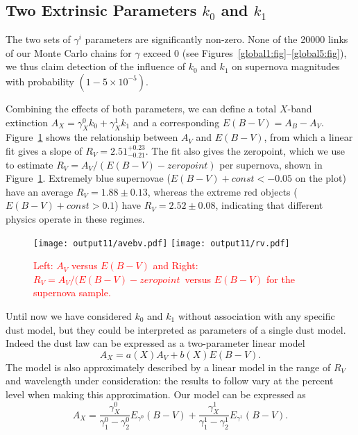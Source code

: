 \documentclass{aastex61}   	%
\begin{document}
\subsection{Two Extrinsic Parameters $k_0$ and $k_1$}
\color{red}
The two sets of  $\gamma^i$ parameters  are significantly non-zero. 
\color{black}
None of the 20000 links of 
our Monte Carlo chains for $\gamma$ exceed 0 (see Figures~\ref{global1:fig}--\ref{global5:fig}), we thus claim detection of the
influence of $k_0$ and $k_1$  on supernova magnitudes
with probability $(1-5\times 10^{-5})$.

\color{red}
Combining the effects of both parameters, we can define a total $X$-band extinction $A_X=\gamma^0_X k_0 + \gamma^1_X k_1$
and a corresponding $E(B-V) = A_B-A_V$.  Figure~\ref{avebv:fig} shows the relationship between $A_V$ and $E(B-V)$, from
which a linear fit gives a slope of $R_V=2.51^{+0.23}_{-0.21}$.  The fit also gives the zeropoint, which we use to 
estimate $R_V=A_V/(E(B-V)-zeropoint)$ per supernova, shown in Figure~\ref{avebv:fig}.
Extremely blue supernovae ($E(B-V) + const <-0.05$ on the plot) have an average $R_V=1.88 \pm   0.13$,
whereas the extreme red objects ($E(B-V) + const >0.1$) have $R_V=  2.52 \pm   0.08$, indicating that different physics
operate in these regimes.

\begin{figure}[htbp] %
   \centering
   \texttt{[image: output11/avebv.pdf]}
   \texttt{[image: output11/rv.pdf]}
   \caption{\textcolor{red}{Left: $A_V$ versus $E(B-V)$ and Right: $R_V=A_V/(E(B-V)-zeropoint$\
   versus $E(B-V)$ for the supernova sample.}
   \label{avebv:fig}}
\end{figure}

Until now we have considered $k_0$ and $k_1$ without association with any specific dust model, but they could be interpreted as
parameters of a single  dust model.  Indeed the \citet{1989ApJ...345..245C} dust law can be expressed as a two-parameter linear model
\begin{equation}
A_X = a(X)  A_V + b(X) E(B-V).
\end{equation}
The \citet{1999PASP..111...63F} model is also approximately described by a linear model in the range of $R_V$ and wavelength under consideration:
the results to follow vary at the percent level when making this approximation.
Our model can be expressed as
\begin{equation}
A_X = \frac{\gamma^0_X}{\gamma^0_1-\gamma^0_2}  E_{\gamma^0}(B-V) +  \frac{\gamma^1_X}{\gamma^1_1-\gamma^1_2}  E_{\gamma^1}(B-V).
\end{equation}
\end{document}
